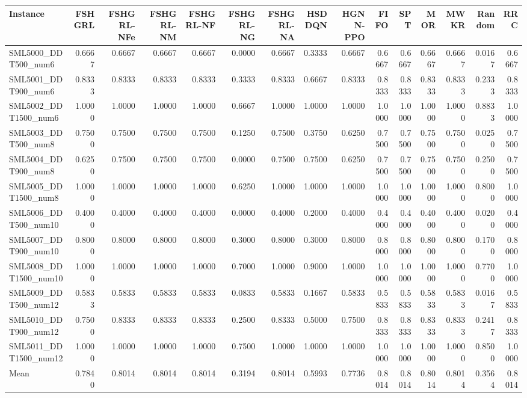 \begin{tabular}{lrrrrrrrrrrrrrr}
\toprule
Instance & FSHGRL & FSHGRL-NFe & FSHGRL-NM & FSHGRL-NF & FSHGRL-NG & FSHGRL-NA & HSDDQN & HGNN-PPO & FIFO & SPT & MOR & MWKR & Random & RRC \\
\midrule
SML5000\_DDT500\_num6 & 0.6667 & 0.6667 & 0.6667 & 0.6667 & 0.0000 & 0.6667 & 0.3333 & 0.6667 & 0.6667 & 0.6667 & 0.6667 & 0.6667 & 0.0167 & 0.6667 \\
SML5001\_DDT900\_num6 & 0.8333 & 0.8333 & 0.8333 & 0.8333 & 0.3333 & 0.8333 & 0.6667 & 0.8333 & 0.8333 & 0.8333 & 0.8333 & 0.8333 & 0.2333 & 0.8333 \\
SML5002\_DDT1500\_num6 & 1.0000 & 1.0000 & 1.0000 & 1.0000 & 0.6667 & 1.0000 & 1.0000 & 1.0000 & 1.0000 & 1.0000 & 1.0000 & 1.0000 & 0.8833 & 1.0000 \\
SML5003\_DDT500\_num8 & 0.7500 & 0.7500 & 0.7500 & 0.7500 & 0.1250 & 0.7500 & 0.3750 & 0.6250 & 0.7500 & 0.7500 & 0.7500 & 0.7500 & 0.0250 & 0.7500 \\
SML5004\_DDT900\_num8 & 0.6250 & 0.7500 & 0.7500 & 0.7500 & 0.0000 & 0.7500 & 0.7500 & 0.6250 & 0.7500 & 0.7500 & 0.7500 & 0.7500 & 0.2500 & 0.7500 \\
SML5005\_DDT1500\_num8 & 1.0000 & 1.0000 & 1.0000 & 1.0000 & 0.6250 & 1.0000 & 1.0000 & 1.0000 & 1.0000 & 1.0000 & 1.0000 & 1.0000 & 0.8000 & 1.0000 \\
SML5006\_DDT500\_num10 & 0.4000 & 0.4000 & 0.4000 & 0.4000 & 0.0000 & 0.4000 & 0.2000 & 0.4000 & 0.4000 & 0.4000 & 0.4000 & 0.4000 & 0.0200 & 0.4000 \\
SML5007\_DDT900\_num10 & 0.8000 & 0.8000 & 0.8000 & 0.8000 & 0.3000 & 0.8000 & 0.3000 & 0.8000 & 0.8000 & 0.8000 & 0.8000 & 0.8000 & 0.1700 & 0.8000 \\
SML5008\_DDT1500\_num10 & 1.0000 & 1.0000 & 1.0000 & 1.0000 & 0.7000 & 1.0000 & 0.9000 & 1.0000 & 1.0000 & 1.0000 & 1.0000 & 1.0000 & 0.7700 & 1.0000 \\
SML5009\_DDT500\_num12 & 0.5833 & 0.5833 & 0.5833 & 0.5833 & 0.0833 & 0.5833 & 0.1667 & 0.5833 & 0.5833 & 0.5833 & 0.5833 & 0.5833 & 0.0167 & 0.5833 \\
SML5010\_DDT900\_num12 & 0.7500 & 0.8333 & 0.8333 & 0.8333 & 0.2500 & 0.8333 & 0.5000 & 0.7500 & 0.8333 & 0.8333 & 0.8333 & 0.8333 & 0.2417 & 0.8333 \\
SML5011\_DDT1500\_num12 & 1.0000 & 1.0000 & 1.0000 & 1.0000 & 0.7500 & 1.0000 & 1.0000 & 1.0000 & 1.0000 & 1.0000 & 1.0000 & 1.0000 & 0.8500 & 1.0000 \\
Mean & 0.7840 & 0.8014 & 0.8014 & 0.8014 & 0.3194 & 0.8014 & 0.5993 & 0.7736 & 0.8014 & 0.8014 & 0.8014 & 0.8014 & 0.3564 & 0.8014 \\
\bottomrule
\end{tabular}
